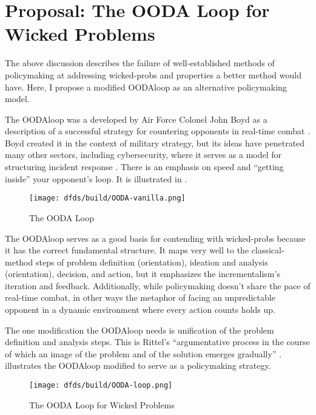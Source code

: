 \wickedtipsend


\section{Proposal: The OODA Loop for Wicked Problems}

The above discussion describes the failure of well-established methods of policymaking at addressing \acp{wicked-prob}
and properties a better method would have. Here, I propose a modified \acs{OODAloop} as an alternative policymaking
model.

The \ac{OODAloop} was a developed by Air Force Colonel John Boyd as a description of a successful strategy for
countering opponents in real-time combat \cite{angerman_2004}. Boyd created it in the context of military strategy, but
its ideas have penetrated many other sectors, including cybersecurity, where it serves as a model for structuring
incident response \cite{schneier_future_2014}. There is an emphasis on speed and ``getting inside'' your opponent's
loop. It is illustrated in .

\begin{figure}[h]
    \centering\CaptionFontSize
    \texttt{[image: dfds/build/OODA-vanilla.png]}
    \caption[The OODA Loop]{The OODA Loop}
    \label{fig-ooda-loop}
\end{figure}

The \ac{OODAloop} serves as a good basis for contending with \acp{wicked-prob} because it has the correct fundamental
structure. It maps very well to the \ac{classical-method} steps of problem definition (orientation), ideation and
analysis (orientation), decision, and action, but it emphasizes the \ac{incrementalism}'s iteration and feedback.
Additionally, while policymaking doesn't share the pace of real-time combat, in other ways the metaphor of facing an
unpredictable opponent in a dynamic environment where every action counts holds up.

The one modification the \ac{OODAloop} needs is unification of the problem definition and analysis steps. This is
Rittel's ``argumentative process in the course of which an image of the problem and of the solution emerges gradually''
\cite{rittel_dilemmas_1973}.  illustrates the \ac{OODAloop} modified to serve as a
policymaking strategy.

\begin{figure}[h]
    \centering\CaptionFontSize
    \texttt{[image: dfds/build/OODA-loop.png]}
    \caption[The OODA Loop for Wicked Problems]{The OODA Loop for Wicked Problems}
    \label{fig-policy-ooda-loop}
\end{figure}



